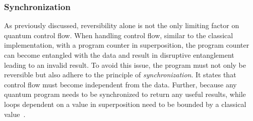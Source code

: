 \subsubsection{Synchronization}
\label{sec:background_controlflow_synchronization}
As previously discussed, reversibility alone is not the only limiting factor on quantum control flow. When handling control flow, similar to the classical implementation, with a program counter in superposition, the program counter can become entangled with the data and result in disruptive entanglement leading to an invalid result. To avoid this issue, the program must not only be reversible but also adhere to the principle of \emph{synchronization}. It states that control flow must become independent from the data. Further, because any quantum program needs to be synchronized to return any useful results, while loops dependent on a value in superposition need to be bounded by a classical value~\cite{YVC24}.